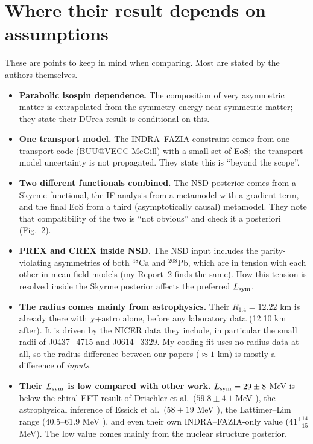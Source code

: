 \documentclass[11pt,a4paper]{article}
\newcommand{\Lsym}{L_{\rm sym}}
\begin{document}
\section{Where their result depends on assumptions}
These are points to keep in mind when comparing. Most are stated by the authors themselves.
\begin{itemize}
\item \textbf{Parabolic isospin dependence.} The composition of very asymmetric matter is extrapolated from the symmetry energy near symmetric matter; they state their DUrca result is conditional on this.
\item \textbf{One transport model.} The INDRA--FAZIA constraint comes from one transport code (BUU@VECC-McGill) with a small set of EoS; the transport-model uncertainty is not propagated. They state this is ``beyond the scope''.
\item \textbf{Two different functionals combined.} The NSD posterior comes from a Skyrme functional, the IF analysis from a metamodel with a gradient term, and the final EoS from a third (asymptotically causal) metamodel. They note that compatibility of the two is ``not obvious'' and check it a posteriori (Fig.~2).
\item \textbf{PREX and CREX inside NSD.} The NSD input includes the parity-violating asymmetries of both $^{48}$Ca and $^{208}$Pb, which are in tension with each other in mean field models (my Report~2 finds the same). How this tension is resolved inside the Skyrme posterior affects the preferred $\Lsym$.
\item \textbf{The radius comes mainly from astrophysics.} Their $R_{1.4}=12.22$ km is already there with $\chi$+astro alone, before any laboratory data (12.10 km after). It is driven by the NICER data they include, in particular the small radii of J0437$-$4715 and J0614$-$3329. My cooling fit uses no radius data at all, so the radius difference between our papers ($\approx1$ km) is mostly a difference of \emph{inputs}.
\item \textbf{Their $\Lsym$ is low compared with other work.} $\Lsym=29\pm8$ MeV is below the chiral EFT result of Drischler et al.\ ($59.8\pm4.1$ MeV \cite{Drischler2020}), the astrophysical inference of Essick et al.\ ($58\pm19$ MeV \cite{Essick2021}), the Lattimer--Lim range (40.5--61.9 MeV \cite{LattimerLim2013}), and even their own INDRA--FAZIA-only value ($41^{+14}_{-15}$ MeV). The low value comes mainly from the nuclear structure posterior.
\end{itemize}
\end{document}
